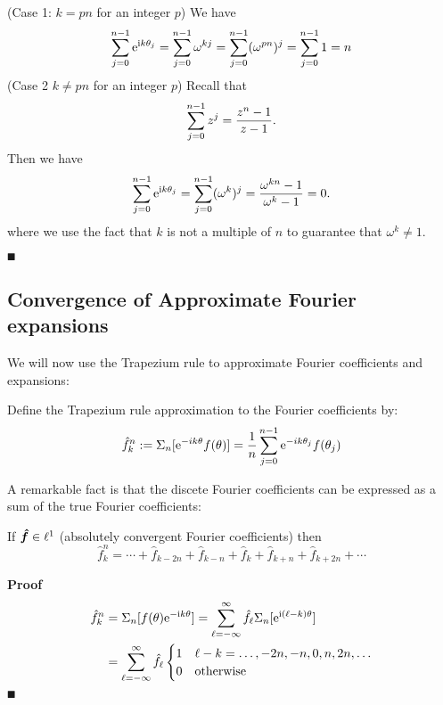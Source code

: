 (Case 1: $k = pn$ for an integer $p$) We have
\[
\ensuremath{\sum}_{j=0}^{n-1} {\rm e}^{{\rm i} k \ensuremath{\theta}_j} = \ensuremath{\sum}_{j=0}^{n-1} \ensuremath{\omega}^{kj} = \ensuremath{\sum}_{j=0}^{n-1} ({\ensuremath{\omega}^{pn}})^j =   \ensuremath{\sum}_{j=0}^{n-1} 1 = n
\]
(Case 2 $k \ensuremath{\neq} pn$ for an integer $p$)  Recall that
\[
\ensuremath{\sum}_{j=0}^{n-1} z^j = {z^n-1 \over z-1}.
\]
Then we have
\[
\ensuremath{\sum}_{j=0}^{n-1} {\rm e}^{{\rm i} k \ensuremath{\theta}_j} = \ensuremath{\sum}_{j=0}^{n-1} (\ensuremath{\omega}^k)^j = {\ensuremath{\omega}^{kn} -1 \over \ensuremath{\omega}^k -1} = 0.
\]
where we use the fact that $k$ is not a multiple of $n$ to guarantee that $\ensuremath{\omega}^k \ensuremath{\neq} 1$.

\ensuremath{\QED}

\subsection{Convergence of Approximate Fourier expansions}
We will now use the Trapezium rule to approximate Fourier coefficients and expansions:

\begin{definition} Define the Trapezium rule approximation to the Fourier coefficients by:
\[
\hat f_k^n := \ensuremath{\Sigma}_n[{\rm e}^{-i k \ensuremath{\theta}} f(\ensuremath{\theta})]  = {1 \over n} \ensuremath{\sum}_{j=0}^{n-1} {\rm e}^{-i k \ensuremath{\theta}_j} f(\ensuremath{\theta}_j)
\]
\end{definition}

A remarkable fact is that the discete Fourier coefficients can be expressed as a sum of the true Fourier coefficients:

\begin{theorem} If ${\mbox{\boldmath$\hat f$\unboldmath}} \in \ell^1$ (absolutely convergent Fourier coefficients) then
\[
\hat f_k^n = \ensuremath{\cdots} + \hat f_{k-2n} + \hat f_{k-n} + \hat f_k + \hat f_{k+n} + \hat f_{k+2n} + \ensuremath{\cdots}
\]
\end{theorem}
\textbf{Proof}
\begin{align*}
\hat f_k^n &= \ensuremath{\Sigma}_n[f(\ensuremath{\theta}) {\rm e}^{-{\rm i} k \ensuremath{\theta}}] = \ensuremath{\sum}_{\ensuremath{\ell}=-\ensuremath{\infty}}^\ensuremath{\infty} \hat f_\ensuremath{\ell} \ensuremath{\Sigma}_n[{\rm e}^{{\rm i} (\ensuremath{\ell}-k) \ensuremath{\theta}}] \\
&= \ensuremath{\sum}_{\ensuremath{\ell}=-\ensuremath{\infty}}^\ensuremath{\infty} \hat f_\ensuremath{\ell} \begin{cases} 1 & \ensuremath{\ell}-k = \ldots,-2n,-n,0,n,2n,\ldots  \cr
0 & \hbox{otherwise}
\end{cases}
\end{align*}
\ensuremath{\QED}

